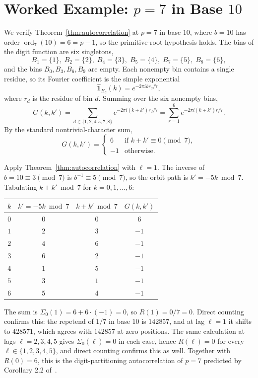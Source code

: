 \documentclass[12pt]{amsart}
\theoremstyle{definition}
\theoremstyle{remark}
\begin{document}
\section{Worked Example: $p = 7$ in Base $10$}\label{sec:p7-example}

We verify Theorem~\ref{thm:autocorrelation} at $p = 7$ in
base $10$, where $b = 10$ has order $\operatorname{ord}_7(10) = 6
= p - 1$, so the primitive-root hypothesis holds. The bins of the
digit function are six singletons,
\[
B_1 = \{1\}, \;
B_2 = \{2\}, \;
B_4 = \{3\}, \;
B_5 = \{4\}, \;
B_7 = \{5\}, \;
B_8 = \{6\},
\]
and the bins $B_0, B_3, B_6, B_9$ are empty. Each nonempty
bin contains a single residue, so its Fourier coefficient
is the simple exponential
\[
\widehat{\mathbf{1}}_{B_d}(k) = e^{-2\pi i k r_d / 7},
\]
where $r_d$ is the residue of bin $d$. Summing over the six
nonempty bins,
\[
G(k, k') = \sum_{d \in \{1,2,4,5,7,8\}}
e^{-2\pi i (k + k') r_d / 7}
= \sum_{r=1}^{6} e^{-2\pi i (k + k') r / 7}.
\]
By the standard nontrivial-character sum,
\[
G(k, k') =
\begin{cases}
6 & \text{if } k + k' \equiv 0 \pmod 7, \\
-1 & \text{otherwise}.
\end{cases}
\]

Apply Theorem~\ref{thm:autocorrelation} with $\ell = 1$.
The inverse of $b = 10 \equiv 3 \pmod 7$ is $b^{-1} \equiv 5
\pmod 7$, so the orbit path is $k' = -5k \bmod 7$.
Tabulating $k + k' \bmod 7$ for $k = 0, 1, \ldots, 6$:
\begin{center}
\begin{tabular}{cccc}
\toprule
$k$ & $k' = -5k \bmod 7$ & $k + k' \bmod 7$ & $G(k, k')$ \\
\midrule
$0$ & $0$ & $0$ & $6$ \\
$1$ & $2$ & $3$ & $-1$ \\
$2$ & $4$ & $6$ & $-1$ \\
$3$ & $6$ & $2$ & $-1$ \\
$4$ & $1$ & $5$ & $-1$ \\
$5$ & $3$ & $1$ & $-1$ \\
$6$ & $5$ & $4$ & $-1$ \\
\bottomrule
\end{tabular}
\end{center}
The sum is $\Sigma_0(1) = 6 + 6 \cdot (-1) = 0$, so
$R(1) = 0/7 = 0$. Direct counting confirms this: the repetend
of $1/7$ in base $10$ is $142857$, and at lag $\ell = 1$ it
shifts to $428571$, which agrees with $142857$ at zero
positions. The same calculation at lags $\ell = 2, 3, 4, 5$
gives $\Sigma_0(\ell) = 0$ in each case, hence
$R(\ell) = 0$ for every $\ell \in \{1, 2, 3, 4, 5\}$, and
direct counting confirms this as well. Together with
$R(0) = 6$, this is the digit-partitioning autocorrelation
of $p = 7$ predicted by Corollary 2.2 of~\cite{paper7}.
\end{document}
